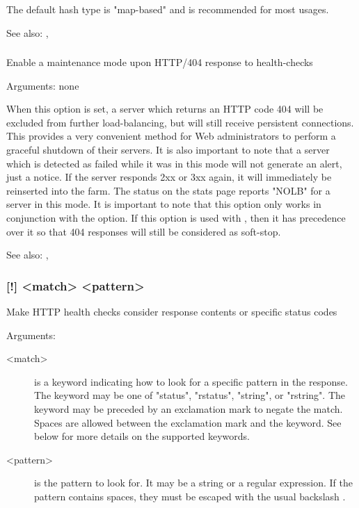   The default hash type is "map-based" and is recommended for most usages.

  See also: , 

\subsubsection[http-check disable-on-404]{}

  Enable a maintenance mode upon HTTP/404 response to health-checks
  
  
  Arguments: none

  When this option is set, a server which returns an HTTP code 404 will be
  excluded from further load-balancing, but will still receive persistent
  connections. This provides a very convenient method for Web administrators
  to perform a graceful shutdown of their servers. It is also important to note
  that a server which is detected as failed while it was in this mode will not
  generate an alert, just a notice. If the server responds 2xx or 3xx again, it
  will immediately be reinserted into the farm. The status on the stats page
  reports "NOLB" for a server in this mode. It is important to note that this
  option only works in conjunction with the  option. If this option
  is used with , then it has precedence over it so that 404
  responses will still be considered as soft-stop.

  See also: , 

\subsubsection[http-check expect]{ [!] <match> <pattern>}

  Make HTTP health checks consider response contents or specific status codes
  
  
  Arguments:
  \begin{description}
  \item[<match>]
              is a keyword indicating how to look for a specific pattern in the
              response. The keyword may be one of "status", "rstatus",
              "string", or "rstring". The keyword may be preceded by an
              exclamation mark \chr{!} to negate the match. Spaces are allowed
              between the exclamation mark and the keyword. See below for more
              details on the supported keywords.

  \item[<pattern>] is the pattern to look for. It may be a string or a regular
              expression. If the pattern contains spaces, they must be escaped
              with the usual backslash \chr{\bslash}.
  \end{description}

